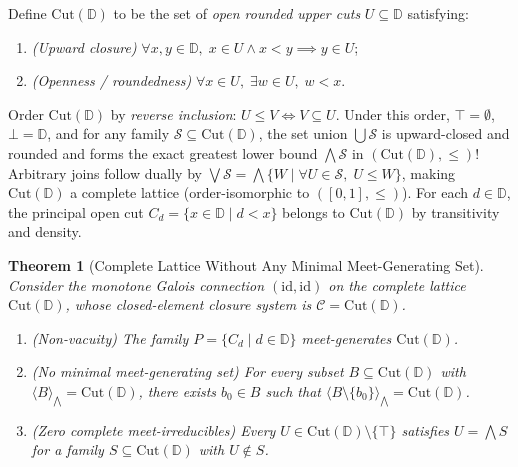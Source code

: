 \documentclass[11pt,a4paper]{article}
\newtheorem{theorem}{Theorem}[section]
\theoremstyle{definition}
\theoremstyle{remark}
\begin{document}
Define $\mathrm{Cut}(\mathbb{D})$ to be the set of \emph{open rounded upper cuts} $U \subseteq \mathbb{D}$ satisfying:
\begin{enumerate}
\item \emph{(Upward closure)} $\forall x, y \in \mathbb{D},\; x \in U \land x < y \implies y \in U$;
\item \emph{(Openness / roundedness)} $\forall x \in U,\; \exists w \in U,\; w < x$.
\end{enumerate}
Order $\mathrm{Cut}(\mathbb{D})$ by \emph{reverse inclusion}: $U \le V \iff V \subseteq U$. Under this order, $\top = \emptyset$, $\bot = \mathbb{D}$, and for any family $\mathcal{S} \subseteq \mathrm{Cut}(\mathbb{D})$, the set union $\bigcup \mathcal{S}$ is upward-closed and rounded and forms the exact greatest lower bound $\bigwedge \mathcal{S}$ in $(\mathrm{Cut}(\mathbb{D}), \le)$! Arbitrary joins follow dually by $\bigvee \mathcal{S} = \bigwedge \{ W \mid \forall U \in \mathcal{S},\; U \le W \}$, making $\mathrm{Cut}(\mathbb{D})$ a complete lattice (order-isomorphic to $([0, 1], \le)$). For each $d \in \mathbb{D}$, the principal open cut $C_d = \{ x \in \mathbb{D} \mid d < x \}$ belongs to $\mathrm{Cut}(\mathbb{D})$ by transitivity and density.

\begin{theorem}[Complete Lattice Without Any Minimal Meet-Generating Set]\label{thm:infinite-cut}
Consider the monotone Galois connection $(\mathrm{id}, \mathrm{id})$ on the complete lattice $\mathrm{Cut}(\mathbb{D})$, whose closed-element closure system is $\mathcal{C} = \mathrm{Cut}(\mathbb{D})$.
\begin{enumerate}
\item \emph{(Non-vacuity)} The family $P = \{ C_d \mid d \in \mathbb{D} \}$ meet-generates $\mathrm{Cut}(\mathbb{D})$.
\item \emph{(No minimal meet-generating set)} For \emph{every} subset $B \subseteq \mathrm{Cut}(\mathbb{D})$ with $\langle B \rangle_{\bigwedge} = \mathrm{Cut}(\mathbb{D})$, there exists $b_0 \in B$ such that $\langle B \setminus \{b_0\} \rangle_{\bigwedge} = \mathrm{Cut}(\mathbb{D})$.
\item \emph{(Zero complete meet-irreducibles)} Every $U \in \mathrm{Cut}(\mathbb{D}) \setminus \{\top\}$ satisfies $U = \bigwedge S$ for a family $S \subseteq \mathrm{Cut}(\mathbb{D})$ with $U \notin S$.
\end{enumerate}
\end{theorem}
\end{document}

